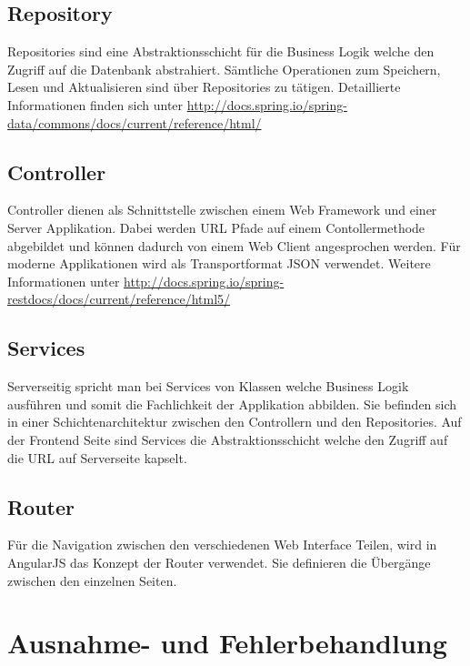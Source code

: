 \subsection{Repository}

Repositories sind eine Abstraktionsschicht für die Business Logik welche den Zugriff auf die Datenbank abstrahiert. Sämtliche Operationen zum Speichern, Lesen und Aktualisieren sind über Repositories zu tätigen.  Detaillierte Informationen finden sich unter \url{http://docs.spring.io/spring-data/commons/docs/current/reference/html/}

\subsection{Controller}

Controller dienen als Schnittstelle zwischen einem Web Framework und einer Server Applikation. Dabei werden URL Pfade auf einem Contollermethode abgebildet und können dadurch von einem Web Client angesprochen werden. Für moderne Applikationen wird als Transportformat JSON verwendet. Weitere Informationen unter \url{http://docs.spring.io/spring-restdocs/docs/current/reference/html5/}

\subsection{Services}

Serverseitig spricht man bei Services von Klassen welche Business Logik ausführen und somit die Fachlichkeit der Applikation abbilden. Sie befinden sich in einer Schichtenarchitektur zwischen den Controllern und den Repositories. Auf der Frontend Seite sind Services die Abstraktionsschicht welche den Zugriff auf die URL auf Serverseite kapselt.

\subsection{Router}

Für die Navigation zwischen den verschiedenen Web Interface Teilen, wird in AngularJS das Konzept der Router verwendet. Sie definieren die Übergänge zwischen den einzelnen Seiten.

\section{Ausnahme- und Fehlerbehandlung}

